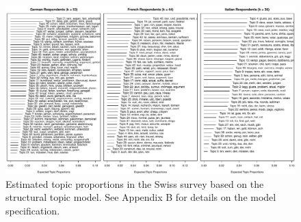 \begin{figure}[h]\centering
\includegraphics[width=\textwidth]{../fig/swiss_stm_prop.pdf}
\caption{Estimated topic proportions in the Swiss survey based on the structural topic model. See Appendix B for details on the model specification.}\label{fig:swiss_stm_prop}
\end{figure}

